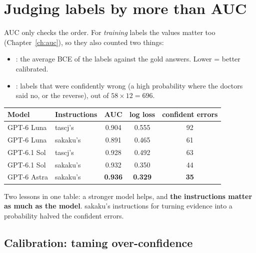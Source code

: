 \section{Judging labels by more than AUC}

AUC only checks the order. For \emph{training} labels the values matter too (Chapter~\ref{ch:auc}), so they also
counted two things:
\begin{itemize}
\item {}: the average BCE of the labels against the gold answers. Lower = better calibrated.
\item {}: labels that were confidently wrong (a high probability where the doctors said no, or
      the reverse), out of $58 \times 12 = 696$.
\end{itemize}

\begin{center}\small
\begin{tabular}{llccc}
\toprule
Model & Instructions & AUC & log loss & confident errors \\
\midrule
GPT-6 Luna & tascj's & 0.904 & 0.555 & 92 \\
GPT-6 Luna & sakaku's & 0.891 & 0.465 & 61 \\
GPT-6.1 Sol & tascj's & 0.928 & 0.492 & 63 \\
GPT-6.1 Sol & sakaku's & 0.932 & 0.350 & 44 \\
GPT-6 Astra & sakaku's & \textbf{0.936} & \textbf{0.329} & \textbf{35} \\
\bottomrule
\end{tabular}
\end{center}
Two lessons in one table: a stronger model helps, and \textbf{the instructions matter as much as the model}. sakaku's
instructions for turning evidence into a probability halved the confident errors.

\subsection*{Calibration: taming over-confidence}

